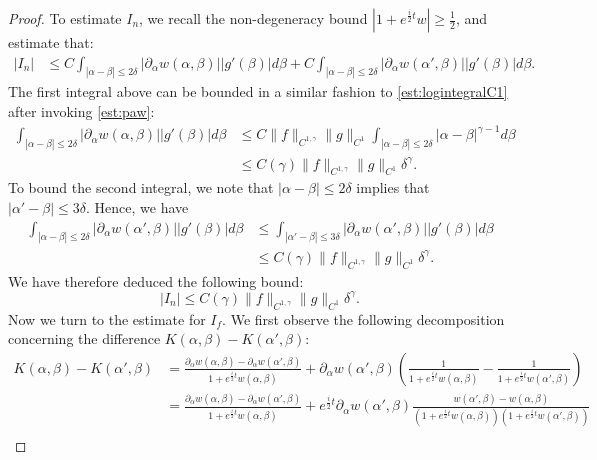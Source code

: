 \documentclass[11pt,reqno]{amsproc}
\newcommand{\p}{\partial}
\newcommand{\palpha}{\p_\alpha}
\begin{document}
\begin{proof}
    To estimate $I_n$, we recall the non-degeneracy bound $|1 + e^{\frac{i}{2}t} w| \ge \frac12$, and estimate that:
    \begin{align*}
        |I_n| &\le C\int_{|\alpha - \beta| \le 2\delta} |\palpha w(\alpha,\beta)||g'(\beta)| d\beta + C\int_{|\alpha - \beta| \le 2\delta} |\palpha w(\alpha',\beta)||g'(\beta)| d\beta.
    \end{align*}
    The first integral above can be bounded in a similar fashion to \eqref{est:logintegralC1} after invoking \eqref{est:paw}:
    \begin{align*}
        \int_{|\alpha - \beta| \le 2\delta} |\palpha w(\alpha,\beta)||g'(\beta)| d\beta &\le C\|f\|_{C^{1,\gamma}}\|g\|_{C^1}\int_{|\alpha - \beta| \le 2\delta} |\alpha - \beta|^{\gamma - 1} d\beta\\
        &\le C(\gamma)\|f\|_{C^{1,\gamma}}\|g\|_{C^1}\delta^\gamma.
    \end{align*}
    To bound the second integral, we note that $|\alpha - \beta| \le 2\delta$ implies that $|\alpha' - \beta| \le 3\delta$. Hence, we have
    \begin{align*}
        \int_{|\alpha - \beta| \le 2\delta} |\palpha w(\alpha',\beta)||g'(\beta)| d\beta &\le \int_{|\alpha' - \beta| \le 3\delta} |\palpha w(\alpha',\beta)||g'(\beta)| d\beta\\
        &\le C(\gamma)\|f\|_{C^{1,\gamma}}\|g\|_{C^1}\delta^\gamma.
    \end{align*}
    We have therefore deduced the following bound:
    \begin{equation}
        \label{est:In}
        |I_n| \le C(\gamma )\|f\|_{C^{1,\gamma}}\|g\|_{C^1}\delta^\gamma.
    \end{equation}
    Now we turn to the estimate for $I_f$. We first observe the following decomposition concerning the difference $K(\alpha,\beta) - K(\alpha',\beta)$:
    \begin{align*}
        K(\alpha,\beta) - K(\alpha',\beta) &= \frac{\palpha w(\alpha,\beta) - \palpha w(\alpha',\beta)}{1+ e^{\frac{i}{2}t} w(\alpha,\beta)} + \palpha w(\alpha',\beta)\left(\frac{1}{1+ e^{\frac{i}{2}t}w(\alpha,\beta)} - \frac{1}{1+ e^{\frac{i}{2}t}w(\alpha',\beta)}\right)\\
        &= \frac{\palpha w(\alpha,\beta) - \palpha w(\alpha',\beta)}{1+ e^{\frac{i}{2}t} w(\alpha,\beta)} + e^{\frac{i}{2}t}\palpha w(\alpha',\beta)\frac{w(\alpha',\beta) - w(\alpha,\beta)}{(1+ e^{\frac{i}{2}t}w(\alpha,\beta))(1+ e^{\frac{i}{2}t}w(\alpha',\beta))}\\

\end{align*}
\end{proof}
\end{document}
